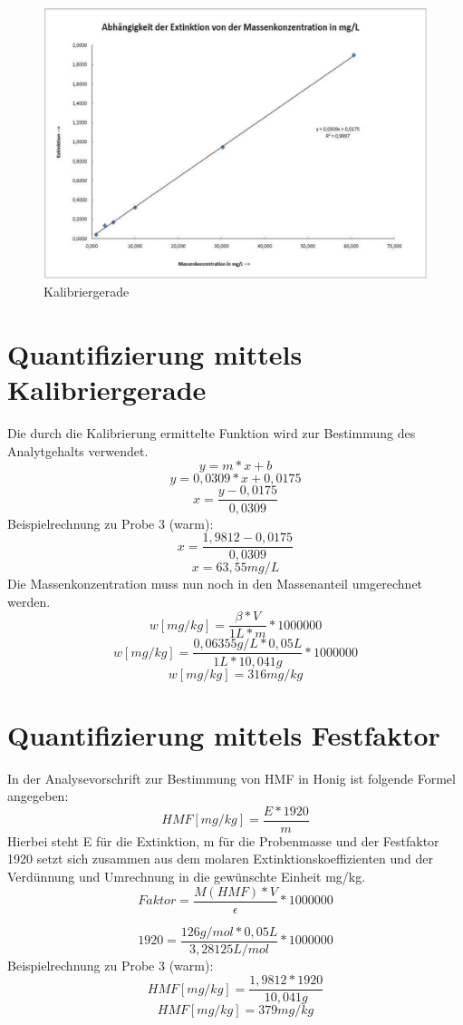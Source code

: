 \begin{figure}[htbp]
	\centering
		\includegraphics[width=1.00\textwidth]{../Bilder/DiagrammKalibrierung2.pdf}
	\caption{Kalibriergerade}
	\label{fig:DiagrammKalibrierung}
\end{figure}

\section{Quantifizierung mittels Kalibriergerade}
Die durch die Kalibrierung ermittelte Funktion wird zur Bestimmung des Analytgehalts verwendet.
	\[y=m*x+b\]
	\[y=0,0309*x+0,0175\]
	\[x=\frac{ y-0,0175 }{ 0,0309 }\]
Beispielrechnung zu Probe 3 (warm):
	\[x=\frac{ 1,9812-0,0175 }{ 0,0309 }\]
	\[x=63,55mg/L\]
Die Massenkonzentration muss nun noch in den Massenanteil umgerechnet werden.
	\[w[mg/kg]=\frac{ \beta*V }{ 1L * m }*1000000\]
	\[w[mg/kg]=\frac{ 0,06355g/L*0,05L }{ 1L * 10,041g }*1000000\]
	\[w[mg/kg]=316mg/kg\]

	
\section{Quantifizierung mittels Festfaktor}
In der Analysevorschrift zur Bestimmung von HMF in Honig ist folgende Formel angegeben:
	\[HMF[mg/kg]=\frac{ E * 1920 }{ m }\]
Hierbei steht E für die Extinktion, m für die Probenmasse und der Festfaktor 1920 setzt sich zusammen aus dem molaren Extinktionskoeffizienten und der Verdünnung und Umrechnung in die gewünschte Einheit mg/kg.
	\[Faktor=\frac{ M(HMF)*V }{ \epsilon }*1000000\]
	
	\[1920=\frac{ 126g/mol * 0,05L }{ 3,28125L/mol }*1000000\]
Beispielrechnung zu Probe 3 (warm):
	\[HMF[mg/kg]=\frac{ 1,9812 * 1920 }{ 10,041g }\]
	\[HMF[mg/kg]=379mg/kg\]
